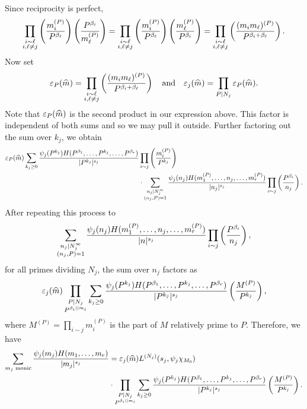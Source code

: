     Since reciprocity is perfect,
    \[
        \prod_{\substack{i \sim \ell \\ i,\ell \neq j}}\left(\frac{m_{i}^{(P)}}{P^{\beta_{\ell}}}\right)\left(\frac{P^{\beta_{i}}}{m_{\ell}^{(P)}}\right) = \prod_{\substack{i \sim \ell \\ i,\ell \neq j}}\left(\frac{m_{i}^{(P)}}{P^{\beta_{\ell}}}\right)\left(\frac{m_{\ell}^{(P)}}{P^{\beta_{i}}}\right) = \prod_{\substack{i \sim \ell \\ i,\ell \neq j}}\left(\frac{(m_{i}m_{\ell})^{(P)}}{P^{\beta_{i}+\beta_{\ell}}}\right).
    \]
    Now set
    \[
        \varepsilon_{P}(\widehat{m}) = \prod_{\substack{i \sim \ell \\ i,\ell \neq j}}\left(\frac{(m_{i}m_{\ell})^{(P)}}{P^{\beta_{i}+\beta_{\ell}}}\right) \quad \text{and} \quad \varepsilon_{j}(\widehat{m}) = \prod_{P \mid N_{j}}\varepsilon_{P}(\widehat{m}).
    \]
    Note that $\varepsilon_{P}(\widehat{m})$ is the second product in our expression above. This factor is independent of both sums and so we may pull it outside. Further factoring out the sum over $k_{j}$, we obtain
    \begin{align*}
        \varepsilon_{P}(\widehat{m})\sum_{k_{j} \ge 0}\frac{\psi_{j}(P^{k_{j}})H(P^{\beta_{1}},\ldots,P^{k_{j}},\ldots,P^{\beta_{r}})}{|P^{k_{j}}|^{s_{j}}}&\prod_{\substack{i \sim j}}\left(\frac{m_{i}^{(P)}}{P^{k_{j}}}\right) \\
        &\cdot \sum_{\substack{n_{j} \mid N_{j}^{\infty} \\ (n_{j},P) = 1}}\frac{\psi_{j}(n_{j})H(m_{1}^{(P)},\ldots,n_{j},\ldots,m_{r}^{(P)})}{|n_{j}|^{s_{j}}}\prod_{\substack{i \sim j}}\left(\frac{P^{\beta_{i}}}{n_{j}}\right).
    \end{align*}
    After repeating this process to
    \[
        \sum_{\substack{n_{j} \mid N_{j}^{\infty} \\ (n_{j},P) = 1}}\frac{\psi_{j}(n_{j})H(m_{1}^{(P)},\ldots,n_{j},\ldots,m_{r}^{(P)})}{|n|^{s_{j}}}\prod_{\substack{i \sim j}}\left(\frac{P^{\beta_{i}}}{n_{j}}\right),
    \]
    for all primes dividing $N_{j}$, the sum over $n_{j}$ factors as
    \[
        \varepsilon_{j}(\widehat{m})\prod_{\substack{P \mid N_{j} \\ P^{\beta_{i} \mid\mid m_{i}}}}\sum_{k_{j} \ge 0}\frac{\psi_{j}(P^{k_{j}})H(P^{\beta_{1}},\ldots,P^{k_{j}},\ldots,P^{\beta_{r}})}{|P^{k_{j}}|^{s_{j}}}\left(\frac{M^{(P)}}{P^{k_{j}}}\right),
    \]
    where $M^{(P)} = \prod_{i \sim j}m_{i}^{(P)}$ is the part of $M$ relatively prime to $P$. Therefore, we have
    \begin{equation}\label{equ:WMDS_functional_equation_2}
        \begin{aligned}
            \sum_{\text{$m_{j}$ monic}}\frac{\psi_{j}(m_{j})H(m_{1},\ldots,m_{r})}{|m_{j}|^{s_{j}}} &= \varepsilon_{j}(\widehat{m})L^{(N_{j})}(s_{j},\psi_{j}\chi_{M_{0}}) \\
            &\cdot \prod_{\substack{P \mid N_{j} \\ P^{\beta_{i} \mid\mid m_{i}}}}\sum_{k_{j} \ge 0}\frac{\psi_{j}(P^{k_{j}})H(P^{\beta_{1}},\ldots,P^{k_{j}},\ldots,P^{\beta_{r}})}{|P^{k_{j}}|^{s_{j}}}\left(\frac{M^{(P)}}{P^{k_{j}}}\right).
        \end{aligned}
    \end{equation}

